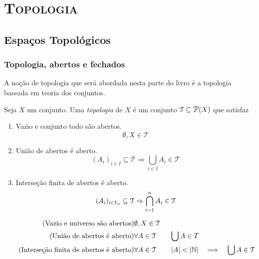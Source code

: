 \part{{\scshape Topologia}}

\chapter{Espaços Topológicos}

\section{Topologia, abertos e fechados}

	A noção de topologia que será abordada nesta parte do livro é a topologia baseada em teoria dos conjuntos.

\begin{defi}
	Seja $X$ um conjunto. Uma \emph{topologia} de $X$ é um conjunto $\mathcal T \subseteq \p(X)$ que satisfaz
	\begin{enumerate}
	\item Vazio e conjunto todo são abertos.
	\begin{equation*}
	\emptyset, X \in \mathcal T
	\end{equation*}

	\item União de abertos é aberto.
	\begin{equation*}
	(A_i)_{i \in I} \subseteq \mathcal T \Rightarrow \displaystyle\bigcup_{i \in I} A_i \in \mathcal T
	\end{equation*}

	\item Interseção finita de abertos é aberto.
	\begin{equation*}
	(A_i)_{i \in \mathtt I_n} \subseteq \mathcal T \Rightarrow \displaystyle\bigcap_{i=1}^n A_i \in \mathcal T
	\end{equation*}
	\end{enumerate}
	
	\begin{align*}
	\tag{Vazio e universo são abertos} &\emptyset, X \in \mathcal T \\
	\tag{União de abertos é aberto} &\forall A \in \mathcal T \qquad \bigcup A \in T \\
	\tag{Interseção finita de abertos é aberto} &\forall A \in \mathcal T \qquad \left\vert{A}\right\vert < \left\vert{\mathbb{N}}\right\vert \quad \Longrightarrow \quad \bigcup A \in \mathcal T
	\end{align*}
\end{defi}

